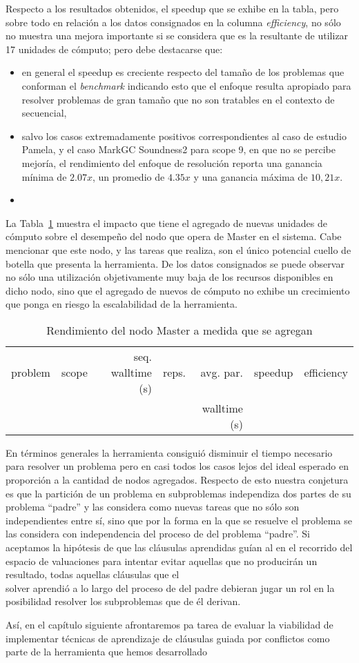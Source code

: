 Respecto a los resultados obtenidos, el speedup que se exhibe en la tabla, pero sobre todo en relación a los datos consignados en la columna \emph{efficiency}, no sólo no muestra una mejora importante si se considera que es la resultante de utilizar 17 unidades de cómputo; pero debe destacarse que:
\begin{itemize}
\item en general el speedup es creciente respecto del tamaño de los problemas que conforman el \emph{benchmark} indicando esto que el enfoque resulta apropiado para resolver problemas de gran tamaño que no son tratables en el contexto de \ssolving secuencial,
\item salvo los casos extremadamente positivos correspondientes al caso de estudio Pamela, y el caso MarkGC Soundness2 para scope 9, en que no se percibe mejoría, el rendimiento del enfoque de resolución reporta una ganancia mínima de $2.07x$, un promedio de $4.35x$ y una ganancia máxima de $10,21x$.
\item 
\end{itemize}

La Tabla~\ref{tab:incremental} muestra el impacto que tiene el agregado de nuevas unidades de cómputo sobre el desempeño del nodo que opera de Master en el sistema. Cabe mencionar que este nodo, y las tareas que realiza, son el único potencial cuello de botella que presenta la herramienta. De los datos consignados se puede observar no sólo una utilización objetivamente muy baja de los recursos disponibles en dicho nodo, sino que el agregado de nuevos \w de cómputo no exhibe un crecimiento que ponga en riesgo la escalabilidad de la herramienta.

\begin{table}
	\footnotesize
	\begin{tabular}{lrrrrrr}
		\toprule
		problem	&	scope	&	seq. walltime (s)	&	reps. & avg. par.	&	speedup	&	efficiency \\
			&		&	&	 & walltime (s)	&		&	 \\
		\cmidrule(r){1-7}
		\bottomrule
	\end{tabular}
	\caption{Rendimiento del nodo Master a medida que se agregan \w}
	\label{tab:incremental}
\end{table}

En términos generales la herramienta consiguió disminuir el tiempo necesario para resolver un problema pero en casi todos los casos lejos del ideal esperado en proporción a la cantidad de nodos agregados. Respecto de esto nuestra conjetura es que la partición de un problema en subproblemas independiza dos partes de su problema ``padre'' y las considera como nuevas tareas que no sólo son independientes entre sí, sino que por la forma en la que se resuelve el problema se las considera con independencia del proceso de \solving del problema ``padre''. Si aceptamos la hipótesis de que las cláusulas aprendidas guían al \ssolver en el recorrido del espacio de valuaciones para intentar evitar aquellas que no producirán un resultado, todas aquellas cláusulas que el \\solver aprendió a lo largo del proceso de \solving del padre debieran jugar un rol en la posibilidad resolver los subproblemas que de él derivan.

Así, en el capítulo siguiente afrontaremos pa tarea de evaluar la viabilidad de implementar técnicas de aprendizaje de cláusulas guiada por conflictos como parte de la herramienta que hemos desarrollado